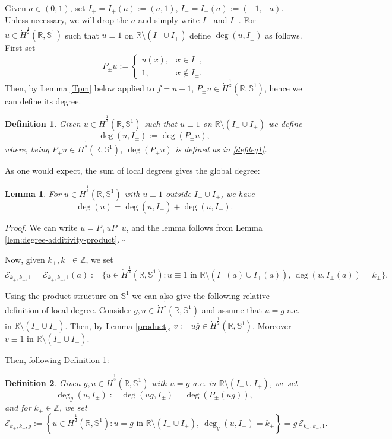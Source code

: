 \documentclass[12pt, a4paper]{article}
\newtheorem{lem}[thm]{Lemma}
\newtheorem{defn}{Definition}[section]
\newenvironment{proof}{\noindent\emph{Proof.}}{\hfill$\square$\medskip}
\newcommand{\sph}{\mathbb{S}}
\newcommand{\R}{\mathbb{R}}
\newcommand{\blu}[1]{{\color{blue}#1}}
\newcommand{\red}[1]{{\color{red}#1}}
\renewcommand{\(}{\left(}
\renewcommand{\)}{\right)}
\begin{document}
Given $a\in (0,1)$, set $I_+=I_+(a):=(a,1)$, $I_-=I_-(a):=(-1,-a)$. Unless necessary, we will drop the $a$ and simply write $I_+$ and $I_-$. For $u\in \dot H^{\frac12}(\R,\sph^1)$ such that $u\equiv 1$ on $\R\setminus (I_-\cup I_+)$ define $\deg(u,I_\pm)$ as follows. First set
\[
P_{\pm}u:=
\begin{cases}
u(x), & x\in I_\pm,\\
1, & x\notin I_\pm.
\end{cases}
\]
Then, by Lemma \ref{Tpm} below applied to $f=u-1$, $P_{\pm}u\in \dot H^{\frac12}(\R,\sph^1)$, hence we can define its degree.
\begin{defn}\label{defdeg} Given $u\in \dot H^{\frac12}(\R,\sph^1)$ such that $u\equiv 1$ on $\R\setminus (I_-\cup I_+)$ we define
$$\deg(u,I_\pm):= \deg(P_{\pm} u),$$
where, being $P_{\pm} u\in \dot H^{\frac12}(\R,\sph^1)$,  $\deg(P_{\pm} u)$ is defined as in \eqref{defdeg1}.
\end{defn}

As one would expect, the sum of local degrees gives the global degree:

\begin{lem}\label{add} For $u\in \dot H^\frac12(\R,\sph^1)$ with $u\equiv 1$ outside $I_-\cup I_+$, we have 
$$\deg(u) =\deg(u,I_+)+\deg(u,I_-).$$
\end{lem}

\begin{proof} We can write $u=P_+u P_-u$, and the lemma follows from Lemma \ref{lem:degree-additivity-product}. %
\end{proof}


Now, given $k_+,k_-\in \mathbb{Z}$, we set
$$\mathcal{E}_{k_+,k_-,1}=\mathcal{E}_{k_+,k_-,1}{(a)}:=\{u\in \dot H^{\frac12}(\R,\sph^1): u\equiv 1 \text{ in }\R\setminus (I_-(a)\cup I_+(a)),\, \deg(u, I_\pm(a))=k_{\pm}\}.$$


Using the product structure on $\sph^1$
we can also give the following relative definition of local degree. Consider $g,u \in \dot H^{\frac12}(\R,\sph^1)$ and assume that $u=g$ a.e. in $\R\setminus (I_-\cup I_+)$. Then, by Lemma \ref{product}, $v:=u\bar g\in\dot H^{\frac12}(\R,\sph^1)$.  %
 Moreover $v\equiv 1$ in $\R\setminus (I_-\cup I_+)$. { Then, following Definition \ref{defdeg}:
\begin{defn} Given $g,u \in \dot H^{\frac12}(\R,\sph^1)$ with $u=g$ a.e. in $\R\setminus (I_-\cup I_+)$, we set
\[
\deg_g(u,I_\pm):=\deg(u\bar g,I_\pm)=\deg(P_{\pm} (u\bar g)),
\]
and for $k_\pm\in\mathbb Z$, we set
\[
\mathcal E_{k_+,k_-,g}:=
\left\{u\in \dot H^{\frac12}(\R,\sph^1):u=g\text{ in }\R\setminus (I_-\cup I_+),
\ \deg_g(u,I_\pm)=k_\pm\right\}
=g\,\mathcal E_{k_+,k_-,1}.
\]
\end{defn}}
\end{document}
